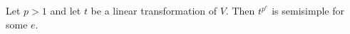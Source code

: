 Let $p > 1$ and let $t$ be a linear transformation of $V$. Then $t^{p^e}$ is semisimple for some $e$.
